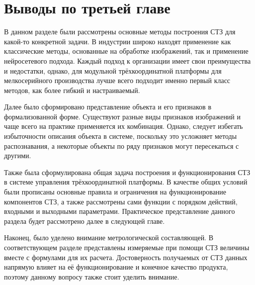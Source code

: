 
\section{Выводы по третьей главе} \label{sect3_6}

В данном разделе были рассмотрены основные методы построения СТЗ для какой-то конкретной задачи. В индустрии широко находят применение как классические методы, основанные на обработке изображений, так и применение нейросетевого подхода. Каждый подход к организации имеет свои преимущества и недостатки, однако, для модульной трёхкоординатной платформы для мелкосерийного производства лучше всего подходит именно первый класс методов, как более гибкий и настраиваемый.

Далее было сформировано представление объекта и его признаков в формализованной форме. Существуют разные виды признаков изображений и чаще всего на практике применяется их комбинация. Однако, следует избегать избыточности описания объекта в системе, поскольку это усложняет методы распознавания, а некоторые объекты по ряду признаков могут пересекаться с другими.

Также была сформулирована общая задача построения и функционирования СТЗ в системе управления трёхкоординатной платформы. В качестве общих условий были прописаны основные правила и ограничения на функционирование компонентов СТЗ, а также рассмотрены сами функции с порядком действий, входными и выходными параметрами. Практическое представление данного раздела будет рассмотрено далее в следующей главе.

Наконец, было уделено внимание метрологической составляющей. В соответствующем разделе представлены измеряемые при помощи СТЗ величины вместе с формулами для их расчета. Достоверность получаемых от СТЗ данных напрямую влияет на её функционирование и конечное качество продукта, поэтому данному вопросу также стоит уделить внимание.